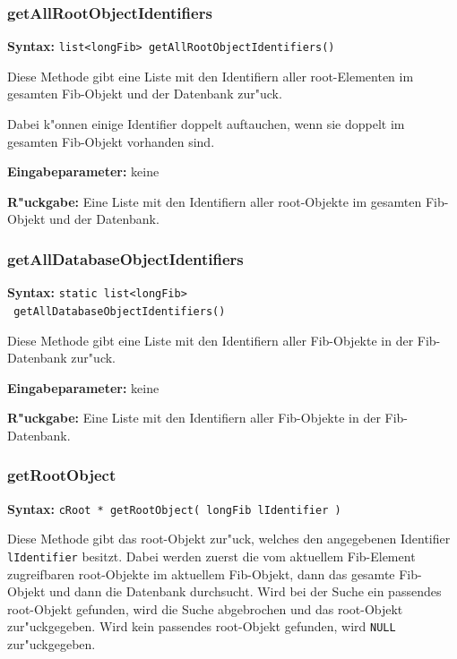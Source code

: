\subsubsection{getAllRootObjectIdentifiers}

\textbf{Syntax:} \verb|list<longFib> getAllRootObjectIdentifiers()|

\bigskip\noindent
Diese Methode gibt eine Liste mit den Identifiern aller root-Elementen im gesamten Fib-Objekt und der Datenbank zur"uck.

Dabei k"onnen einige Identifier doppelt auftauchen, wenn sie doppelt im gesamten Fib-Objekt vorhanden sind.

\bigskip\noindent
\textbf{Eingabeparameter:} keine

\bigskip\noindent
\textbf{R"uckgabe:} Eine Liste mit den Identifiern aller root-Objekte im gesamten Fib-Objekt und der Datenbank.


\subsubsection{getAllDatabaseObjectIdentifiers}

\textbf{Syntax:} \verb|static list<longFib>| \\\verb| getAllDatabaseObjectIdentifiers()|

\bigskip\noindent
Diese Methode gibt eine Liste mit den Identifiern aller Fib-Objekte in der Fib-Datenbank zur"uck.

\bigskip\noindent
\textbf{Eingabeparameter:} keine

\bigskip\noindent
\textbf{R"uckgabe:} Eine Liste mit den Identifiern aller Fib-Objekte in der Fib-Datenbank.


\subsubsection{getRootObject}

\textbf{Syntax:} \verb|cRoot * getRootObject( longFib lIdentifier )|

\bigskip\noindent
Diese Methode gibt das root-Objekt zur"uck, welches den angegebenen Identifier \verb|lIdentifier| besitzt. Dabei werden zuerst die vom aktuellem Fib-Element zugreifbaren root-Objekte im aktuellem Fib-Objekt, dann das gesamte Fib-Objekt und dann die Datenbank durchsucht. Wird bei der Suche ein passendes root-Objekt gefunden, wird die Suche abgebrochen und das root-Objekt zur"uckgegeben. Wird kein passendes root-Objekt gefunden, wird \verb|NULL| zur"uckgegeben.

